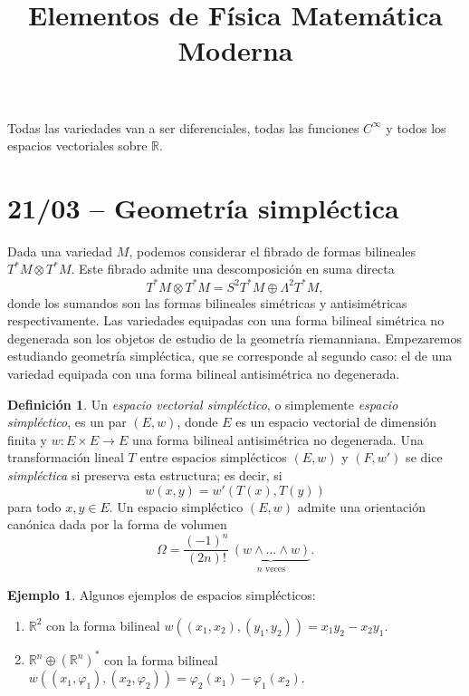 \documentclass[11pt, a4paper]{article}
\title{Elementos de Física Matemática Moderna}
\date{}
\newcommand{\RR}{\mathbb{R}}
\newcommand{\cinf}{C^\infty}
\newcommand{\cotg}{T^*M}
\theoremstyle{plain}
\theoremstyle{definition}
\newtheorem{defn}[prop]{Definición}
\newtheorem{exmp}[prop]{Ejemplo}
\begin{document}
\maketitle{}

Todas las variedades van a ser diferenciales, todas las funciones $\cinf$ y todos los espacios vectoriales sobre $\RR$.
\section{21/03 -- Geometría simpléctica}
Dada una variedad $M$, podemos considerar el fibrado de formas bilineales $\cotg\otimes\cotg$. Este fibrado admite una descomposición en suma directa
\[\cotg\otimes\cotg = S^2\cotg \oplus \Lambda^2 \cotg,\]
donde los sumandos son las formas bilineales simétricas y antisimétricas respectivamente. Las variedades equipadas con una forma bilineal simétrica no degenerada son los objetos de estudio de la geometría riemanniana. Empezaremos estudiando geometría simpléctica, que se corresponde al segundo caso: el de una variedad equipada con una forma bilineal antisimétrica no degenerada.

\begin{defn} Un \emph{espacio vectorial simpléctico}, o simplemente \emph{espacio simpléctico}, es un par $(E,w)$, donde $E$ es un espacio vectorial de dimensión finita y $w:E\times E\to E$ una forma bilineal antisimétrica no degenerada. Una transformación lineal $T$ entre espacios simplécticos $(E,w)$ y $(F,w')$ se dice \emph{simpléctica} si preserva esta estructura; es decir, si
\[w(x,y)=w'\left(T(x), T(y)\right)\]
para todo $x,y\in E$. Un espacio simpléctico $(E,w)$ admite una orientación canónica dada por la forma de volumen
\[\Omega = \frac{(-1)^n}{(2n)!}\, \underbrace{(w\wedge\dots\wedge w)}_{\substack{\text{$n$ veces}}}.\]
\end{defn}

\begin{exmp} Algunos ejemplos de espacios simplécticos:
\begin{enumerate}
\item $\RR^2$ con la forma bilineal $w\left((x_1,x_2), (y_1,y_2)\right)=x_1y_2 - x_2y_1$.
\item $\RR^n\oplus (\RR^n)^*$ con la forma bilineal $w\left((x_1,\varphi_1),(x_2,\varphi_2)\right) = \varphi_2(x_1)-\varphi_1(x_2)$.
\end{enumerate}
\end{exmp}
\end{document}
